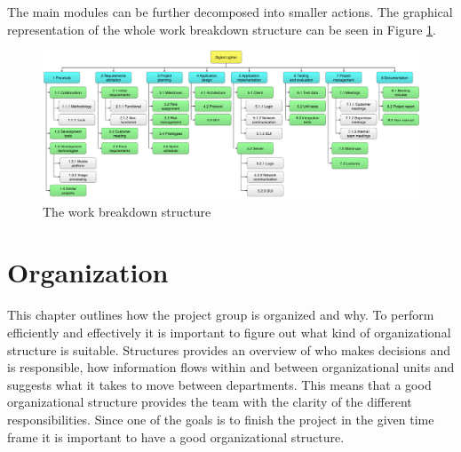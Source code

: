 The main modules can be further decomposed into smaller actions. The graphical representation of the whole work breakdown structure can be seen in Figure \ref{fig:wbs}.

\begin{figure}[!h]
	\centering
		\includegraphics[width=20cm, angle=90]{images/wbs}
	\caption{The work breakdown structure}
	\label{fig:wbs}
\end{figure}

\section{Organization}
This chapter outlines how the project group is organized and why.
To perform efficiently and effectively it is important to figure out what kind of organizational structure is suitable. 
Structures provides an overview of who makes decisions and is responsible, how information flows within and between organizational units and suggests what it takes to move between departments. This means that a good organizational structure provides the team with the clarity of the different responsibilities. Since one of the goals is to finish the project in the given time frame it is important to have a good organizational structure.

